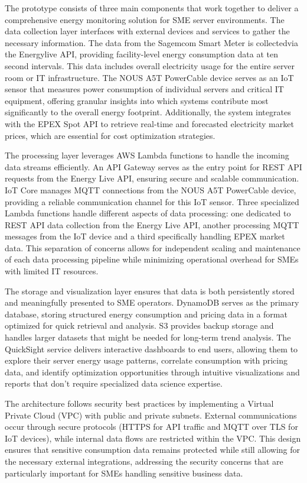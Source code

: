 The prototype consists of three main components that work together to deliver a comprehensive
energy monitoring solution for SME server environments. The data collection layer interfaces with
external devices and services to gather the necessary information. The data from the Sagemcom Smart
Meter is collectedvia the Energylive API, providing facility-level energy consumption data at
ten second intervals. This data includes overall electricity usage for the entire server room or IT
infrastructure. The NOUS A5T PowerCable device serves as an IoT sensor that measures power consumption
of individual servers and critical IT equipment, offering granular insights into which systems
contribute most significantly to the overall energy footprint. Additionally, the system integrates
with the EPEX Spot API to retrieve real-time and forecasted electricity market prices, which
are essential for cost optimization strategies.

The processing layer leverages AWS Lambda functions to handle the incoming data streams
efficiently. An API Gateway serves as the entry point for REST API requests from the Energy Live API,
ensuring secure and scalable communication. IoT Core manages MQTT connections from the NOUS A5T
PowerCable device, providing a reliable communication channel for this IoT sensor.
Three specialized Lambda functions handle different aspects of data processing: one dedicated to
REST API data collection from the Energy Live API, another processing MQTT messages from the IoT device
and a third specifically handling EPEX market data. This separation of concerns allows for
independent scaling and maintenance of each data processing pipeline while minimizing operational
overhead for SMEs with limited IT resources.

The storage and visualization layer ensures that data is both persistently stored and meaningfully
presented to SME operators. DynamoDB serves as the primary database, storing structured energy
consumption and pricing data in a format optimized for quick retrieval and analysis. S3 provides
backup storage and handles larger datasets that might be needed for long-term trend analysis. The
QuickSight service delivers interactive dashboards to end users, allowing them to explore their
server energy usage patterns, correlate consumption with pricing data, and identify optimization
opportunities through intuitive visualizations and reports that don't require specialized data
science expertise.

The architecture follows security best practices by implementing a Virtual Private Cloud (VPC) with
public and private subnets. External communications occur through secure protocols
(HTTPS for API traffic and MQTT over TLS for IoT devices), while internal data flows are restricted
within the VPC. This design ensures that sensitive consumption data remains protected while still
allowing for the necessary external integrations, addressing the security concerns that are
particularly important for SMEs handling sensitive business data.

